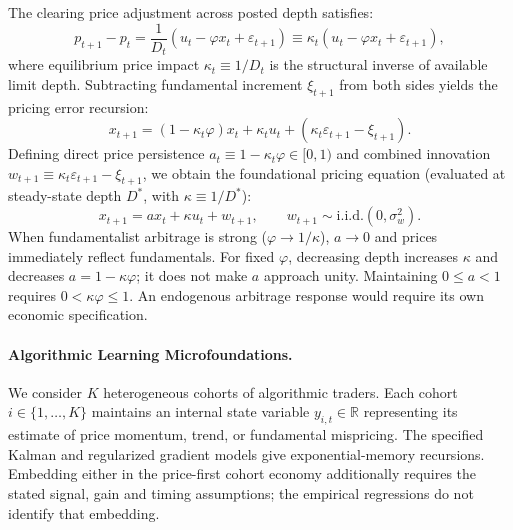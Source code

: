 \documentclass[12pt]{article}
\theoremstyle{definition}
\theoremstyle{remark}
\newcommand{\R}{\mathbb{R}}
\begin{document}
The clearing price adjustment across posted depth satisfies:
\begin{equation}
p_{t+1} - p_t = \frac{1}{D_t} \left( u_t - \varphi x_t + \varepsilon_{t+1} \right) \equiv \kappa_t \left( u_t - \varphi x_t + \varepsilon_{t+1} \right),
\end{equation}
where equilibrium price impact $\kappa_t \equiv 1/D_t$ is the structural inverse of available limit depth. Subtracting fundamental increment $\xi_{t+1}$ from both sides yields the pricing error recursion:
\begin{equation}
x_{t+1} = (1 - \kappa_t \varphi) x_t + \kappa_t u_t + \left( \kappa_t \varepsilon_{t+1} - \xi_{t+1} \right).
\end{equation}
Defining direct price persistence $a_t \equiv 1 - \kappa_t \varphi \in [0, 1)$ and combined innovation $w_{t+1} \equiv \kappa_t \varepsilon_{t+1} - \xi_{t+1}$, we obtain the foundational pricing equation (evaluated at steady-state depth $D^*$, with $\kappa \equiv 1/D^*$):
\begin{equation}
x_{t+1} = a x_t + \kappa u_t + w_{t+1}, \qquad w_{t+1} \sim \text{i.i.d.}(0, \sigma_w^2).
\label{eq:micro_pricing}
\end{equation}
When fundamentalist arbitrage is strong ($\varphi \to 1/\kappa$), $a \to 0$ and prices immediately reflect fundamentals. For fixed $\varphi$, decreasing depth increases $\kappa$ and decreases $a=1-\kappa\varphi$; it does not make $a$ approach unity. Maintaining $0\le a<1$ requires $0<\kappa\varphi\le1$. An endogenous arbitrage response would require its own economic specification.

\paragraph{Algorithmic Learning Microfoundations.}
We consider $K$ heterogeneous cohorts of algorithmic traders. Each cohort $i \in \{1, \dots, K\}$ maintains an internal state variable $y_{i,t} \in \R$ representing its estimate of price momentum, trend, or fundamental mispricing. The specified Kalman and regularized gradient models give exponential-memory recursions. Embedding either in the price-first cohort economy additionally requires the stated signal, gain and timing assumptions; the empirical regressions do not identify that embedding.
\end{document}

